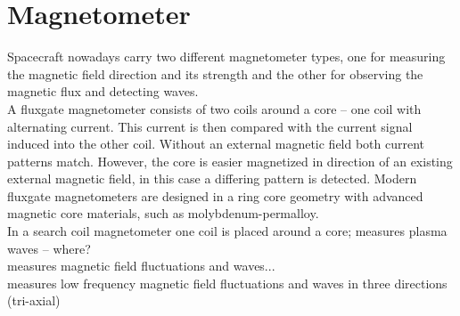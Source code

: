 

\section{Magnetometer}
\label{sec:magnetometer}

Spacecraft nowadays carry two different magnetometer types, one for measuring the magnetic field direction and its strength and the other for observing the magnetic flux and detecting waves.\\

A fluxgate magnetometer consists of two coils around a core -- one coil with alternating current. This current is then compared with the current signal induced into the other coil. Without an external magnetic field both current patterns match. However, the core is easier magnetized in direction of an existing external magnetic field, in this case a differing pattern is detected. Modern fluxgate magnetometers are designed in a ring core geometry with advanced magnetic core materials, such as molybdenum-permalloy.\\

In a search coil magnetometer one coil is placed around a core; measures plasma waves -- where?\\
measures magnetic field fluctuations and waves...\\
measures low frequency magnetic field fluctuations and waves in three directions (tri-axial)\\

